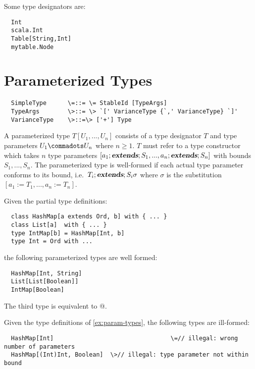 \documentclass[11pt]{report}
\begin{document}
\example Some type designators are:

\begin{verbatim}
  Int
  scala.Int
  Table[String,Int]
  mytable.Node
\end{verbatim}

\section{Parameterized Types}
\label{sec:param-types}

\syntax\begin{verbatim}
  SimpleType      \=::= \= StableId [TypeArgs]
  TypeArgs        \>::= \> `[' VarianceType {`,' VarianceType} `]'
  VarianceType    \>::=\> ['+'] Type
\end{verbatim}

A parameterized type $T[U_1, ..., U_n]$ consists of a type designator
$T$ and type parameters $U_1 \commadots U_n$ where $n \geq 1$.  $T$
must refer to a type constructor which takes $n$ type parameters $[a_1
;\mbox{\sl\bfseries extends}; S_1, ..., a_n ;\mbox{\sl\bfseries extends}; S_n]$ with bounds $S_1, ..., S_n$.
The parameterized type is well-formed if each actual type parameter
conforms to its bound, i.e.\ $T_i ;\mbox{\sl\bfseries extends}; S_i\sigma$ where $\sigma$
is the substitution $[a_1 := T_1, ..., a_n := T_n]$.

\example\label{ex:param-types}
Given the partial type definitions:

\begin{verbatim}
  class HashMap[a extends Ord, b] with { ... }
  class List[a]  with { ... }
  type IntMap[b] = HashMap[Int, b]
  type Int = Ord with ...
\end{verbatim}

the following parameterized types are well formed:

\begin{verbatim}
  HashMap[Int, String]
  List[List[Boolean]]
  IntMap[Boolean]
\end{verbatim}

The third type is equivalent to @.

\example Given the type definitions of \ref{ex:param-types},
the following types are ill-formed:

\begin{verbatim}
  HashMap[Int]			                       \=// illegal: wrong number of parameters
  HashMap[(Int)Int, Boolean]  \>// illegal: type parameter not within bound
\end{verbatim}
\end{document}
